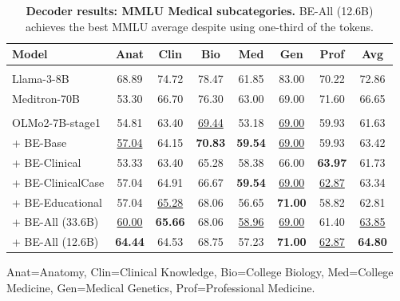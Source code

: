 \begin{table}[t]
\centering
\small
\setlength{\tabcolsep}{6pt}
\begin{threeparttable}[b]
\begin{tabular}{l S[table-format=2.2] S[table-format=2.2] S[table-format=2.2] S[table-format=2.2] S[table-format=2.2] S[table-format=2.2] S[table-format=2.2]}
\toprule
\textbf{Model} & {\textbf{Anat}} & {\textbf{Clin}} & {\textbf{Bio}} & {\textbf{Med}} & {\textbf{Gen}} & {\textbf{Prof}} & {\textbf{Avg}} \\
\midrule
{}
 \\[1pt]
Llama-3-8B & 68.89 & 74.72 & 78.47 & 61.85 & 83.00 & 70.22 & 72.86 \\
Meditron-70B & 53.30 & 66.70 & 76.30 & 63.00 & 69.00 & 71.60 & 66.65 \\
\midrule
{}
 \\[1pt]
OLMo2-7B-stage1 & 54.81 & 63.40 & \underline{69.44} & 53.18 & \underline{69.00} & 59.93 & 61.63 \\
\quad + BE-Base & \underline{57.04} & 64.15 & \bfseries 70.83 & \bfseries 59.54 & \underline{69.00} & 59.93 & 63.42 \\
\quad + BE-Clinical & 53.33 & 63.40 & 65.28 & 58.38 & 66.00 & \bfseries 63.97 & 61.73 \\
\quad + BE-ClinicalCase & 57.04 & 64.91 & 66.67 & \bfseries 59.54 & \underline{69.00} & \underline{62.87} & 63.34 \\
\quad + BE-Educational & 57.04 & \underline{65.28} & 68.06 & 56.65 & \bfseries 71.00 & 58.82 & 62.81 \\
\quad + BE-All (33.6B) & \underline{60.00} & \bfseries 65.66 & 68.06 & \underline{58.96} & \underline{69.00} & 61.40 & \underline{63.85} \\
\quad + BE-All (12.6B) & \bfseries 64.44 & 64.53 & 68.75 & 57.23 & \bfseries 71.00 & \underline{62.87} & \bfseries 64.80 \\
\bottomrule
\end{tabular}
\begin{tablenotes}
  \small
  \item Anat=Anatomy, Clin=Clinical Knowledge, Bio=College Biology, Med=College Medicine, Gen=Medical Genetics, Prof=Professional Medicine.
\end{tablenotes}
\end{threeparttable}
\caption{\textbf{Decoder results: MMLU Medical subcategories.} BE-All (12.6B) achieves the best MMLU average despite using one-third of the tokens.}
\label{tab:decoder-mmlu}
\end{table}

